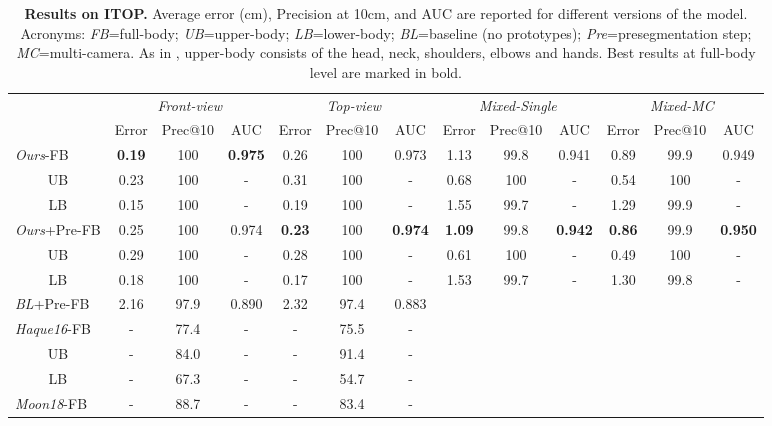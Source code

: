\documentclass[review,12pt,3p]{elsarticle}
\begin{document}
\begin{table}[tbh]
\caption{\textbf{Results on ITOP.} Average error (cm), Precision at 10cm, and AUC are reported for different versions of the model. Acronyms: \textit{FB}=full-body; \textit{UB}=upper-body; \textit{LB}=lower-body; \textit{BL}=baseline (no prototypes); \textit{Pre}=presegmentation step; \textit{MC}=multi-camera. As in \cite{haque2016eccv}, upper-body consists of the head, neck, shoulders, elbows and hands. Best results at full-body level are marked in bold.
}
\label{tab:resCompITOP}
\scriptsize
\begin{center}
\setlength{\tabcolsep}{0.2em} %
\begin{tabular}{|l|c c c|c c c|c c c|c c c|}
\cline{2-13}%
 \multicolumn{1}{c|}{}& \multicolumn{3}{c|}{\textit{Front-view}} & \multicolumn{3}{c|}{\textit{Top-view}} & \multicolumn{3}{c|}{\textit{Mixed-Single}} & \multicolumn{3}{c|}{\textit{Mixed-MC}} \\
\cline{2-13} %
\multicolumn{1}{c|}{} & Error & Prec@10 & AUC & Error & Prec@10 & AUC & Error & Prec@10 & AUC & Error & Prec@10 & AUC \\ 
\cline{2-13} \hline
\textit{Ours}-FB & \textbf{0.19} & 100 & \textbf{0.975} & 0.26 & 100 & 0.973 & 1.13 & 99.8 & 0.941 & 0.89 & 99.9 & 0.949\\
\multicolumn{1}{|c|}{UB} & 0.23 & 100 & - & 0.31 & 100 & - & 0.68 & 100 & - & 0.54 & 100 & -\\
\multicolumn{1}{|c|}{LB} & 0.15 & 100 & - & 0.19 & 100 & - & 1.55 & 99.7 & - & 1.29 & 99.9 & -\\
\hline
\textit{Ours}+Pre-FB & 0.25 & 100& 0.974& \textbf{0.23} & 100 & \textbf{0.974}&
\textbf{1.09} & 99.8 & \textbf{0.942} & \textbf{0.86} & 99.9 & \textbf{0.950}\\
\multicolumn{1}{|c|}{UB} & 0.29& 100&- & 0.28 & 100 & -&
0.61 &100&- & 0.49 & 100 & -\\
\multicolumn{1}{|c|}{LB} & 0.18& 100&- & 0.17 & 100 & - &
1.53 & 99.7 & - & 1.30 & 99.8 &-\\
\hline
\cline{1-7}
\textit{BL}+Pre-FB & 2.16 & 97.9 & 0.890 & 2.32 & 97.4 & 0.883 \\ %
\cline{1-7} %
\textit{Haque16}-FB & - & 77.4 & - & -  & 75.5 & -\\
\multicolumn{1}{|c|}{UB} & - & 84.0 & - & -  & 91.4 & -\\
\multicolumn{1}{|c|}{LB} & - & 67.3 & - & -  & 54.7 & -\\
\cline{1-7}
\textit{Moon18}-FB & - & 88.7 & - & -  & 83.4 & -\\
\cline{1-7}

\end{tabular} 
\end{center}
\end{table}
\end{document}
